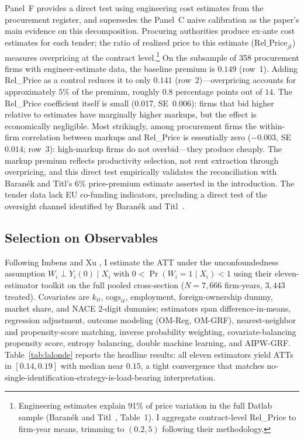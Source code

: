 \documentclass[11pt]{article}
\begin{document}
Panel~F provides a direct test using engineering cost estimates from the procurement register, and supersedes the Panel~C naive calibration as the paper's main evidence on this decomposition. Procuring authorities produce ex-ante cost estimates for each tender; the ratio of realized price to this estimate ($\mathrm{Rel\_Price}_{jt}$) measures overpricing at the contract level.\footnote{Engineering estimates explain 91\% of price variation in the full Datlab sample (Baran\'{e}k and Titl~\cite{BaranekTitl2024}, Table~1). I aggregate contract-level Rel\_Price to firm-year means, trimming to $(0.2, 5)$ following their methodology.} On the subsample of 358 procurement firms with engineer-estimate data, the baseline premium is $0.149$ (row~1). Adding Rel\_Price as a control reduces it to only $0.141$ (row~2)---overpricing accounts for approximately $5\%$ of the premium, roughly $0.8$ percentage points out of $14$. The Rel\_Price coefficient itself is small (0.017, SE~0.006): firms that bid higher relative to estimates have marginally higher markups, but the effect is economically negligible. Most strikingly, among procurement firms the within-firm correlation between markups and Rel\_Price is essentially zero ($-0.003$, SE~$0.014$; row~3): high-markup firms do not overbid---they produce cheaply. The markup premium reflects productivity selection, not rent extraction through overpricing, and this direct test empirically validates the reconciliation with Baran\'{e}k and Titl's \cite{BaranekTitl2024} $6\%$ price-premium estimate asserted in the introduction. The tender data lack EU co-funding indicators, precluding a direct test of the oversight channel identified by Baran\'{e}k and Titl~\cite{BaranekTitl2024}.

\subsection{Selection on Observables}\label{sec:unconfound}

Following Imbens and Xu \cite{ImbensXu2025}, I estimate the ATT under the unconfoundedness assumption $W_i \perp Y_i(0) \mid X_i$ with $0 < \Pr(W_i = 1 \mid X_i) < 1$ using their eleven-estimator toolkit on the full pooled cross-section ($N = 7{,}666$ firm-years, $3{,}443$ treated). Covariates are $k_{it}$, $\text{cogs}_{it}$, employment, foreign-ownership dummy, market share, and NACE 2-digit dummies; estimators span difference-in-means, regression adjustment, outcome modeling (OM-Reg, OM-GRF), nearest-neighbor and propensity-score matching, inverse probability weighting, covariate-balancing propensity score, entropy balancing, double machine learning, and AIPW-GRF. Table~\ref{tab:lalonde} reports the headline results: all eleven estimators yield ATTs in $[0.14, 0.19]$ with median near $0.15$, a tight convergence that matches no-single-identification-strategy-is-load-bearing interpretation.
\end{document}
